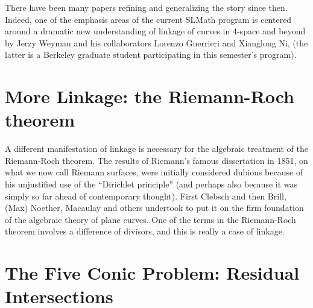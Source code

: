 \documentclass[11pt, oneside]{article}   	%
\begin{document}
There have been many papers refining and generalizing the story since then. Indeed, one of the emphasis areas of the current SLMath program is centered around a dramatic new understanding of linkage of curves in 4-space and beyond by Jerzy Weyman and his collaborators
Lorenzo Guerrieri and Xianglong Ni, (the latter is a Berkeley graduate student participating in this semester's program).

\section{More Linkage: the Riemann-Roch theorem}
A different manifestation of linkage is necessary for the algebraic treatment of the Riemann-Roch theorem. The results of Riemann's famous dissertation in 1851, on what we now call Riemann surfaces, were initially considered
dubious because of his unjustified use of the ``Dirichlet principle'' (and perhaps also because it was simply so far ahead of contemporary thought). First Clebsch and then Brill, (Max) Noether, Macaulay and others undertook to put it on the firm foundation of the algebraic theory of plane curves. One of the terms in the Riemann-Roch theorem involves a difference of divisors, and this is really a case of linkage.

\section{The Five Conic Problem: Residual Intersections}
\end{document}
